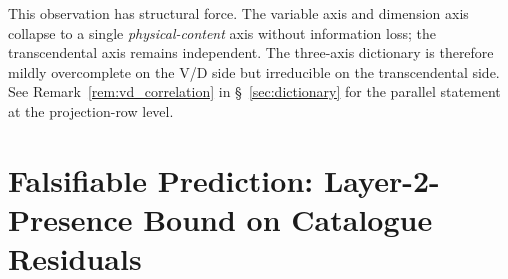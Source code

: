 \documentclass[11pt]{article}
\begin{document}
This observation has structural force.  The variable axis and
dimension axis collapse to a single \emph{physical-content} axis
without information loss; the transcendental axis remains
independent.  The three-axis dictionary is therefore mildly
overcomplete on the V/D side but irreducible on the
transcendental side.  See Remark~\ref{rem:vd_correlation} in
\S~\ref{sec:dictionary} for the parallel statement at the
projection-row level.

\section{Falsifiable Prediction: Layer-2-Presence Bound on
Catalogue Residuals}
\label{sec:prediction}
\end{document}

